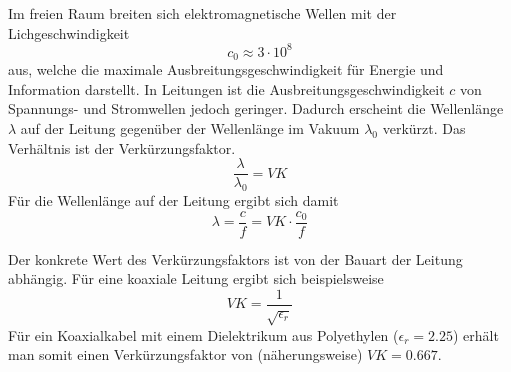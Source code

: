 Im freien Raum breiten sich elektromagnetische Wellen mit der Lichgeschwindigkeit
\[c_0 \approx 3 \cdot 10^8\]
aus, welche die maximale Ausbreitungsgeschwindigkeit für Energie und Information
darstellt. In Leitungen ist die Ausbreitungsgeschwindigkeit $c$ von Spannungs- und
Stromwellen jedoch geringer. Dadurch erscheint die Wellenlänge $\lambda$ auf der Leitung
gegenüber der Wellenlänge im Vakuum $\lambda_0$ verkürzt. Das Verhältnis ist der Verkürzungsfaktor.
\[\frac{\lambda}{\lambda_0} = VK\]
Für die Wellenlänge auf der Leitung ergibt sich damit
\[\lambda = \frac{c}{f} = VK \cdot \frac{c_0}{f}\]

Der konkrete Wert des Verkürzungsfaktors ist von der Bauart der Leitung
abhängig. Für eine koaxiale Leitung ergibt sich beispielsweise
\[ {VK} = \frac{1}{\sqrt{\epsilon_r}}\]
Für ein Koaxialkabel mit einem Dielektrikum aus Polyethylen ($\epsilon_r =
2.25$) erhält man somit einen Verkürzungsfaktor von (näherungsweise) $VK = 0.667$.
